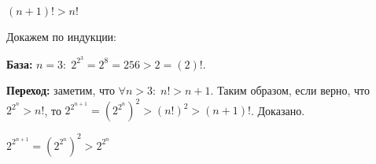 	\begin{proposition}
		\label{p20}
		$(n+1)! > n!$
	\end{proposition}
	
	\begin{proposition}
		\label{p21}
		Докажем по индукции:
		
		\textbf{База:} $n = 3:\; 2^{2^3} = 2^8 = 256 > 2 = (2)!$.
		
		\textbf{Переход:} заметим, что $\forall n>3:\; n! > n+1$. Таким образом, если верно, что $2^{2^n} > n!$, то $2^{2^{n+1}} = (2^{2^n})^2 > (n!)^2 > (n+1)!$. Доказано.
	\end{proposition}
	
	\begin{proposition}
		\label{p22}
		$2^{2^{n+1}} = (2^{2^n})^2 > 2^{2^n}$
	\end{proposition}

